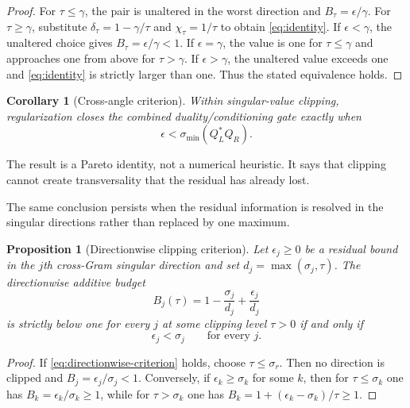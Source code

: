 \documentclass[12pt]{article}
\newtheorem{proposition}[theorem]{Proposition}
\newtheorem{corollary}[theorem]{Corollary}
\theoremstyle{remark}
\begin{document}
\begin{proof}
For $\tau\le\gamma$, the pair is unaltered in the worst direction and
$B_\tau=\epsilon/\gamma$.  For $\tau\ge\gamma$, substitute
$\delta_\tau=1-\gamma/\tau$ and $\chi_\tau=1/\tau$ to obtain
\eqref{eq:identity}.  If $\epsilon<\gamma$, the unaltered choice gives
$B_\tau=\epsilon/\gamma<1$.  If $\epsilon=\gamma$, the value is one for
$\tau\le\gamma$ and approaches one from above for $\tau>\gamma$.  If
$\epsilon>\gamma$, the unaltered value exceeds one and
\eqref{eq:identity} is strictly larger than one.  Thus the stated
equivalence holds.
\end{proof}

\begin{corollary}[Cross-angle criterion]\label{cor:criterion}
Within singular-value clipping, regularization closes the combined
duality/conditioning gate exactly when
\begin{equation}\label{eq:criterion}
 \epsilon<\sigma_{\min}(Q_L^*Q_R).
\end{equation}
\end{corollary}

The result is a Pareto identity, not a numerical heuristic.  It says that
clipping cannot create transversality that the residual has already lost.

The same conclusion persists when the residual information is resolved in
the singular directions rather than replaced by one maximum.

\begin{proposition}[Directionwise clipping criterion]\label{prop:directionwise}
Let $\epsilon_j\ge0$ be a residual bound in the $j$th cross-Gram singular
direction and set $d_j=\max(\sigma_j,\tau)$.  The directionwise additive
budget
\begin{equation}\label{eq:directionwise-budget}
 B_j(\tau)=1-\frac{\sigma_j}{d_j}+\frac{\epsilon_j}{d_j}
\end{equation}
is strictly below one for every $j$ at some clipping level $\tau>0$ if and
only if
\begin{equation}\label{eq:directionwise-criterion}
 \epsilon_j<\sigma_j\qquad\text{for every }j.
\end{equation}
\end{proposition}

\begin{proof}
If \eqref{eq:directionwise-criterion} holds, choose
$\tau\le\sigma_r$.  Then no direction is clipped and
$B_j=\epsilon_j/\sigma_j<1$.  Conversely, if
$\epsilon_k\ge\sigma_k$ for some $k$, then for
$\tau\le\sigma_k$ one has $B_k=\epsilon_k/\sigma_k\ge1$, while for
$\tau>\sigma_k$ one has
$B_k=1+(\epsilon_k-\sigma_k)/\tau\ge1$.
\end{proof}
\end{document}
